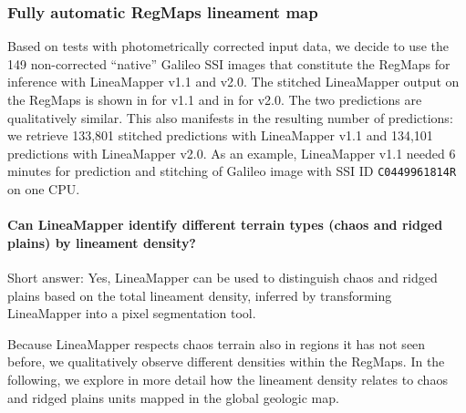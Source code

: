 
\subsubsection{Fully automatic RegMaps lineament map}\label{sec:fullRegMaps}

Based on tests with photometrically corrected input data, we decide to use the 149 non-corrected ``native'' Galileo SSI images that constitute the RegMaps for inference with LineaMapper v1.1 and v2.0. The stitched LineaMapper output on the RegMaps is shown in  for v1.1 and in  for v2.0. The two predictions are qualitatively similar. This also manifests in the resulting number of predictions: we retrieve 133,801 stitched predictions with LineaMapper v1.1 and 134,101 predictions with LineaMapper v2.0. As an example, LineaMapper v1.1 needed 6 minutes for prediction and stitching of Galileo image with SSI ID \texttt{C0449961814R} on one CPU. 


\paragraph{\textbf{Can LineaMapper identify different terrain types (chaos and ridged plains) by lineament density?}}\label{sec:Q1LM_terraintypes}
Short answer: Yes, LineaMapper can be used to distinguish chaos and ridged plains based on the total lineament density, inferred by transforming LineaMapper into a pixel segmentation tool.


Because LineaMapper respects chaos terrain also in regions it has not seen before, we qualitatively observe different densities within the RegMaps. In the following, we explore in more detail how the lineament density relates to chaos and ridged plains units mapped in the global geologic map. 

